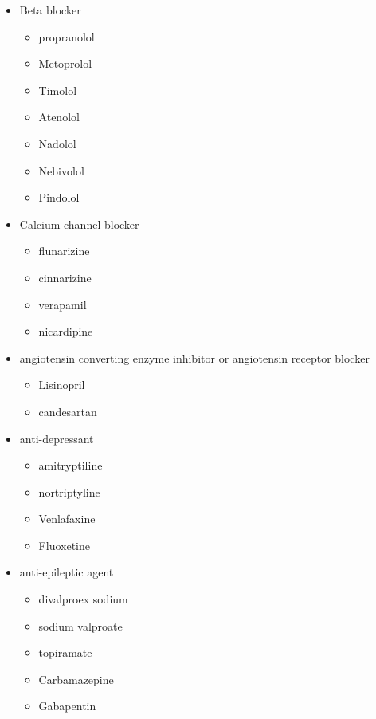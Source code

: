 \documentclass[]{book}
\providecommand{\tightlist}{%
  \setlength{\itemsep}{0pt}\setlength{\parskip}{0pt}}
\begin{document}
\begin{itemize}
\item
  Beta blocker

  \begin{itemize}
  \tightlist
  \item
    propranolol
  \item
    Metoprolol
  \item
    Timolol
  \item
    Atenolol
  \item
    Nadolol
  \item
    Nebivolol
  \item
    Pindolol
  \end{itemize}
\item
  Calcium channel blocker

  \begin{itemize}
  \tightlist
  \item
    flunarizine
  \item
    cinnarizine
  \item
    verapamil
  \item
    nicardipine
  \end{itemize}
\item
  angiotensin converting enzyme inhibitor or angiotensin receptor blocker

  \begin{itemize}
  \tightlist
  \item
    Lisinopril
  \item
    candesartan
  \end{itemize}
\item
  anti-depressant

  \begin{itemize}
  \tightlist
  \item
    amitryptiline
  \item
    nortriptyline
  \item
    Venlafaxine
  \item
    Fluoxetine
  \end{itemize}
\item
  anti-epileptic agent

  \begin{itemize}
  \tightlist
  \item
    divalproex sodium
  \item
    sodium valproate
  \item
    topiramate
  \item
    Carbamazepine
  \item
    Gabapentin
  \end{itemize}
\end{itemize}


\end{document}
